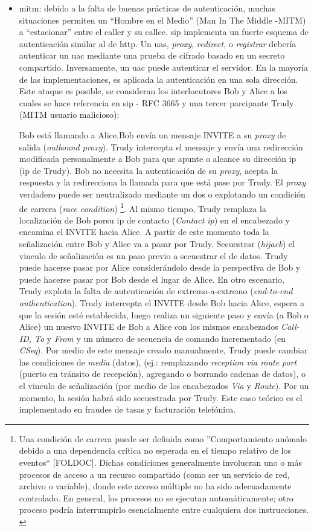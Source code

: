 \documentclass[a4paper,12pt]{report}
\begin{document}
\begin{itemize}
\item \ac{mitm}:
debido a la falta de buenas prácticas de autenticación, muchas situaciones
permiten un ``Hombre en el Medio'' (Man In The Middle -MITM) a ``estacionar''
entre el caller y su callee. \ac{sip} implementa un fuerte esquema de autenticación
similar al de \ac{http}. Un \ac{uas}, \emph{proxy}, \emph{redirect}, o \emph{registrar} debería
autenticar un \ac{uac}
mediante una prueba de cifrado basado en un secreto compartido. Inversamente, un
\ac{uac} puede autenticar el servidor. En la mayoría de las implementaciones, es
aplicada la autenticación en una sola dirección. Este ataque es posible, se
consideran los interlocutores Bob y Alice a los cuales se hace referencia en \ac{sip}
- RFC 3665 \cite{johnrfc3665} y una tercer parcipante Trudy
(MITM usuario malicioso):

Bob está llamando a Alice.Bob envía un mensaje INVITE a su \emph{proxy} de salida
(\emph{outbound proxy}). Trudy intercepta el mensaje y envía una redirección
modificada personalmente a Bob para que apunte o alcance su dirección \ac{ip}
(\ac{ip} de Trudy). Bob no necesita la autenticación de su \emph{proxy}, acepta la
respuesta y la redirecciona la llamada para que está pase por Trudy. El \emph{proxy}
verdadero puede ser neutralizado mediante un \ac{dos} o explotando un condición de
carrera (\emph{race condition}) \footnote{Una condición de carrera puede
ser definida como ''Comportamiento anómalo debido a una dependencia crítica no
esperada en el tiempo relativo de los eventos`` [FOLDOC]. Dichas condiciones 
generalmente involucran uno o más procesos de acceso a un recurso compartido
(como ser un servicio de red, archivo o variable), donde este acceso múltiple no
ha sido adecuadamente controlado. En general, los procesos no se ejecutan
automáticamente; otro proceso podría interrumpirlo esencialmente entre
cualquiera dos instrucciones. \cite{wheeler}}. Al mismo tiempo, Trudy remplaza la localización de Bob porsu \ac{ip} de
contacto (\emph{Contact \ac{ip}}) en el encabezado y encamina el INVITE hacia Alice.
A partir de este momento toda la señalización entre Bob y Alice va a pasar por
Trudy. Secuestrar (\emph{hijack}) el vinculo de señalización es un paso
previo a secuestrar el de datos. Trudy puede hacerse pasar por Alice
considerándolo desde la perspectiva de Bob y puede hacerse pasar por Bob desde
el lugar de Alice.
En otro escenario, Trudy explota la falta de autenticación de extremo-a-extremo
(\emph{end-to-end authentication}). Trudy intercepta el INVITE desde Bob hacia
Alice, espera a que la sesión esté establecida, luego realiza un siguiente paso
y envía (a Bob o Alice) un nuesvo INVITE de Bob a Alice con los mismos
encabezados \emph{Call-ID, To} y \emph{From} y un número de
secuencia de comando incrementado (en \emph{CSeq}). Por medio de este
mensaje creado manualmente, Trudy puede cambiar las condiciones de \emph{media}
(datos), (ej.: remplazando \emph{reception via route port} 
(puerto en tránsito de recepción), agregando o borrando cadenas de datos), o el
vinculo de señalización (por medio de los encabezados \emph{Via} y
\emph{Route}). Por un momento, la sesión habrá sido secuestrada por
Trudy. Este caso teórico es el implementado en fraudes de tasas y
facturación telefónica. 


\end{itemize}
\end{document}
